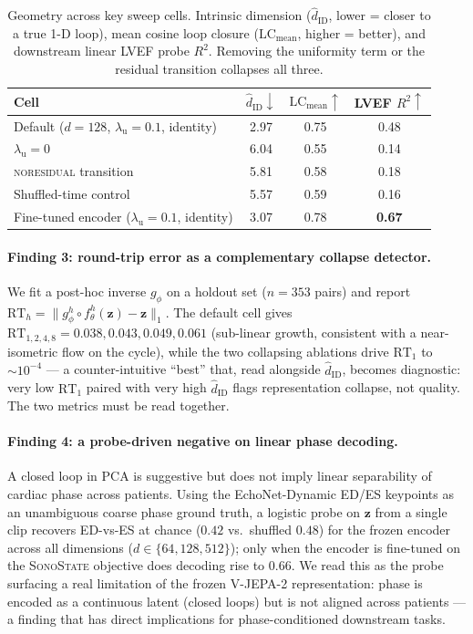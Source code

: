 \documentclass[runningheads]{llncs}
\newcommand{\sonostate}{\textsc{SonoState}\xspace}
\begin{document}
\begin{table}[t]
\centering
\caption{Geometry across key sweep cells. Intrinsic dimension
($\widehat{d}_\mathrm{ID}$, lower = closer to a true 1-D loop), mean
cosine loop closure ($\mathrm{LC}_\mathrm{mean}$, higher = better), and
downstream linear LVEF probe $R^2$. Removing the uniformity term or the
residual transition collapses all three.}
\label{tab:geometry}
\small
\begin{tabular}{lccc}
\toprule
Cell & $\widehat{d}_\mathrm{ID}\downarrow$ & $\mathrm{LC}_\mathrm{mean}\uparrow$ & LVEF $R^2\uparrow$ \\
\midrule
Default ($d{=}128$, $\lambda_\mathrm{u}{=}0.1$, identity)  & 2.97 & 0.75 & 0.48 \\
$\lambda_\mathrm{u}{=}0$                                   & 6.04 & 0.55 & 0.14 \\
\textsc{noresidual} transition                              & 5.81 & 0.58 & 0.18 \\
Shuffled-time control                                       & 5.57 & 0.59 & 0.16 \\
Fine-tuned encoder ($\lambda_\mathrm{u}{=}0.1$, identity)  & 3.07 & 0.78 & \textbf{0.67} \\
\bottomrule
\end{tabular}
\end{table}

\paragraph{Finding 3: round-trip error as a complementary collapse detector.}
We fit a post-hoc inverse $g_\phi$ on a holdout set ($n{=}353$ pairs) and
report $\mathrm{RT}_h = \lVert g_\phi^h \circ f_\theta^h(\mathbf{z}) - \mathbf{z}\rVert_1$.
The default cell gives $\mathrm{RT}_{1,2,4,8} \!=\! 0.038, 0.043, 0.049, 0.061$
(sub-linear growth, consistent with a near-isometric flow on the cycle),
while the two collapsing ablations drive $\mathrm{RT}_1$ to ${\sim}10^{-4}$
--- a counter-intuitive ``best'' that, read alongside
$\widehat{d}_\mathrm{ID}$, becomes diagnostic: very low $\mathrm{RT}_1$
paired with very high $\widehat{d}_\mathrm{ID}$ flags representation
collapse, not quality. The two metrics must be read together.

\paragraph{Finding 4: a probe-driven negative on linear phase decoding.}
A closed loop in PCA is suggestive but does not imply linear separability
of cardiac phase across patients. Using the EchoNet-Dynamic ED/ES
keypoints as an unambiguous coarse phase ground truth, a logistic probe on
$\mathbf{z}$ from a single clip recovers ED-vs-ES at chance ($0.42$ vs.\
shuffled $0.48$) for the frozen encoder across all dimensions
($d\!\in\!\{64,128,512\}$); only when the encoder is fine-tuned on the
\sonostate objective does decoding rise to $0.66$. We read this as the
probe surfacing a real limitation of the frozen V-JEPA-2 representation:
phase is encoded as a continuous latent (closed loops) but is not aligned
across patients --- a finding that has direct implications for
phase-conditioned downstream tasks.
\end{document}
